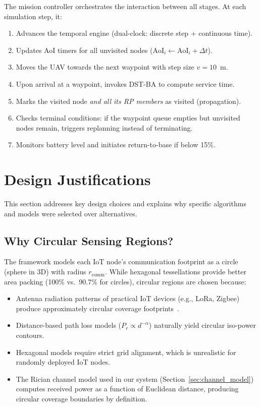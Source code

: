 \documentclass[12pt, a4paper, oneside]{report}
\begin{document}
The mission controller orchestrates the interaction between all stages. At each simulation step, it:

\begin{enumerate}
    \item Advances the temporal engine (dual-clock: discrete step + continuous time).
    \item Updates AoI timers for all unvisited nodes ($\text{AoI}_i \gets \text{AoI}_i + \Delta t$).
    \item Moves the UAV towards the next waypoint with step size $v = 10$~m.
    \item Upon arrival at a waypoint, invokes DST-BA to compute service time.
    \item Marks the visited node \textit{and all its RP members} as visited (propagation).
    \item Checks terminal conditions: if the waypoint queue empties but unvisited nodes remain, triggers replanning instead of terminating.
    \item Monitors battery level and initiates return-to-base if below 15\%.
\end{enumerate}


\section{Design Justifications}
\label{sec:design_justifications}

This section addresses key design choices and explains why specific algorithms and models were selected over alternatives.

\subsection{Why Circular Sensing Regions?}

The framework models each IoT node's communication footprint as a circle (sphere in 3D) with radius $r_{\text{comm}}$. While hexagonal tessellations provide better area packing (100\% vs.\ 90.7\% for circles), circular regions are chosen because:
\begin{itemize}
    \item Antenna radiation patterns of practical IoT devices (e.g., LoRa, Zigbee) produce approximately circular coverage footprints~\cite{mozaffari2019tutorial}.
    \item Distance-based path loss models ($P_r \propto d^{-\alpha}$) naturally yield circular iso-power contours.
    \item Hexagonal models require strict grid alignment, which is unrealistic for randomly deployed IoT nodes.
    \item The Rician channel model used in our system (Section~\ref{sec:channel_model}) computes received power as a function of Euclidean distance, producing circular coverage boundaries by definition.
\end{itemize}
\end{document}
